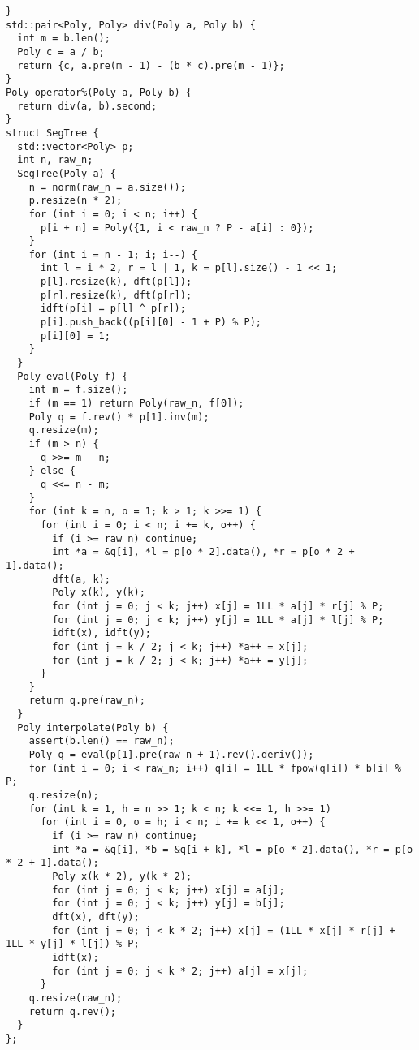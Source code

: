 \documentclass[]{article}
\begin{document}
\begin{verbatim}
}
std::pair<Poly, Poly> div(Poly a, Poly b) {
  int m = b.len();
  Poly c = a / b;
  return {c, a.pre(m - 1) - (b * c).pre(m - 1)};
}
Poly operator%(Poly a, Poly b) {
  return div(a, b).second;
}
struct SegTree {
  std::vector<Poly> p;
  int n, raw_n;
  SegTree(Poly a) {
    n = norm(raw_n = a.size());
    p.resize(n * 2);
    for (int i = 0; i < n; i++) {
      p[i + n] = Poly({1, i < raw_n ? P - a[i] : 0});
    }
    for (int i = n - 1; i; i--) {
      int l = i * 2, r = l | 1, k = p[l].size() - 1 << 1;
      p[l].resize(k), dft(p[l]);
      p[r].resize(k), dft(p[r]);
      idft(p[i] = p[l] ^ p[r]);
      p[i].push_back((p[i][0] - 1 + P) % P);
      p[i][0] = 1;
    }
  }
  Poly eval(Poly f) {
    int m = f.size();
    if (m == 1) return Poly(raw_n, f[0]);
    Poly q = f.rev() * p[1].inv(m);
    q.resize(m);
    if (m > n) {
      q >>= m - n;
    } else {
      q <<= n - m;
    }
    for (int k = n, o = 1; k > 1; k >>= 1) {
      for (int i = 0; i < n; i += k, o++) {
        if (i >= raw_n) continue;
        int *a = &q[i], *l = p[o * 2].data(), *r = p[o * 2 + 1].data();
        dft(a, k);
        Poly x(k), y(k);
        for (int j = 0; j < k; j++) x[j] = 1LL * a[j] * r[j] % P;
        for (int j = 0; j < k; j++) y[j] = 1LL * a[j] * l[j] % P;
        idft(x), idft(y);
        for (int j = k / 2; j < k; j++) *a++ = x[j];
        for (int j = k / 2; j < k; j++) *a++ = y[j];
      }
    }
    return q.pre(raw_n);
  }
  Poly interpolate(Poly b) {
    assert(b.len() == raw_n);
    Poly q = eval(p[1].pre(raw_n + 1).rev().deriv());
    for (int i = 0; i < raw_n; i++) q[i] = 1LL * fpow(q[i]) * b[i] % P;
    q.resize(n);
    for (int k = 1, h = n >> 1; k < n; k <<= 1, h >>= 1)
      for (int i = 0, o = h; i < n; i += k << 1, o++) {
        if (i >= raw_n) continue;
        int *a = &q[i], *b = &q[i + k], *l = p[o * 2].data(), *r = p[o * 2 + 1].data();
        Poly x(k * 2), y(k * 2);
        for (int j = 0; j < k; j++) x[j] = a[j];
        for (int j = 0; j < k; j++) y[j] = b[j];
        dft(x), dft(y);
        for (int j = 0; j < k * 2; j++) x[j] = (1LL * x[j] * r[j] + 1LL * y[j] * l[j]) % P;
        idft(x);
        for (int j = 0; j < k * 2; j++) a[j] = x[j];
      }
    q.resize(raw_n);
    return q.rev();
  }
};


\end{verbatim}
\end{document}
